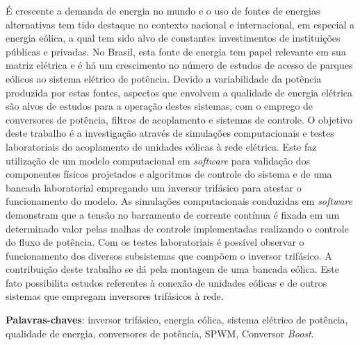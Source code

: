 \begin{resumo}
 
É crescente a demanda de energia no mundo e o uso de fontes de energias alternativas tem tido destaque 
no contexto nacional e internacional, em especial a energia eólica, a qual tem sido alvo de constantes 
investimentos de instituições públicas e privadas. No Brasil, esta fonte de energia tem 
papel relevante em sua matriz elétrica e 
é há um crescimento no número de estudos de acesso de parques eólicos ao sistema elétrico de potência. 
Devido a variabilidade da potência produzida por estas fontes, aspectos que envolvem a qualidade de
energia elétrica são alvos de estudos para a operação destes sistemas, com o emprego de conversores de 
potência, filtros de acoplamento e sistemas de controle.
O objetivo deste trabalho é a investigação através de simulações computacionais e testes laboratoriais
do acoplamento de unidades eólicas à rede elétrica. 
Este faz utilização de um modelo computacional em \textit{software} para validação dos componentes 
físicos projetados e algoritmos de controle do sistema e de uma bancada laboratorial empregando um
inversor trifásico para atestar o funcionamento do modelo.
As simulações computacionais conduzidas em \textit{software} demonstram que a tensão no barramento 
de corrente contínua é fixada em um determinado valor pelas malhas de controle implementadas 
realizando o controle do fluxo de potência. Com os testes laboratoriais é possível observar o funcionamento
dos diversos subsistemas que compõem o inversor trifásico.
A contribuição deste trabalho se dá pela montagem de uma bancada eólica. Este fato possibilita estudos 
referentes à conexão de unidades eólicas e de outros sistemas que empregam inversores trifásicos à rede.


 \vspace{\onelineskip}
    
 \noindent
 \textbf{Palavras-chaves}: inversor trifásico, energia eólica, sistema elétrico de potência, qualidade de energia, conversores de potência, SPWM, Conversor \textit{Boost}.
\end{resumo}
